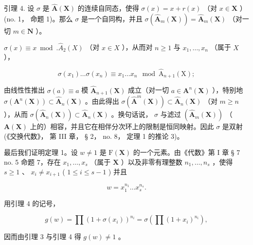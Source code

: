 引理 4. 设 \(\sigma\) 是 \(\hat{\mathbf{A}}(\mathbf{X})\) 的连续自同态，使得 \(\sigma(x) = x + r(x)\) （对 \(x \in \mathbf{X}\) ）(no. 1， 命题 1)。那么 \(\sigma\) 是一个自同构，并且 \(\sigma(\hat{\mathbf{A}}_m(\mathbf{X})) = \hat{\mathbf{A}}_m(\mathbf{X})\) （对一切 \(m \in \mathbf{N}\) ）。

\(\sigma(x) \equiv x \bmod. \hat{A}_2(X)\) （对 \(x \in X\) ），从而对 \(n \geqslant 1\) 与 \(x_1, \ldots, x_n\) （属于 \(X\) ），

\[
\sigma (x _ {1}) \dots \sigma (x _ {n}) \equiv x _ {1} \dots x _ {n} \mod \hat {\mathrm{A}} _ {n + 1} (\mathrm{X});
\]

由线性性推出 \(\sigma(a) \equiv a\) 模 \(\hat{\mathbf{A}}_{n+1}(\mathbf{X})\) 成立（对一切 \(a \in \mathbf{A}^n(\mathbf{X})\) ），特别地 \(\sigma(\mathbf{A}^n(\mathbf{X})) \subset \hat{\mathbf{A}}_n(\mathbf{X})\) 。由此得出 \(\sigma(\hat{\mathbf{A}}^m(\mathbf{X})) \subset \hat{\mathbf{A}}_n(\mathbf{X})\) （对 \(m \geqslant n\) ），从而 \(\sigma(\hat{\mathbf{A}}_n(\mathbf{X})) \subset \hat{\mathbf{A}}_n(\mathbf{X})\) 。换句话说， \(\sigma\) 与滤过 \((\hat{\mathbf{A}}_m(\mathbf{X}))\) （\(\mathbf{A}(\mathbf{X})\) 上的）相容，并且它在相伴分次环上的限制是恒同映射。因此 \(\sigma\) 是双射 (《交换代数》， 第 III 章， § 2， no. 8， 定理 1 的推论 3)。

最后我们证明定理 1。设 \(w \neq 1\) 是 \(\mathrm{F}(\mathbf{X})\) 的一个元素。由《代数》第 I 章 § 7 no. 5 命题 7，存在 \(x_{1}, \ldots, x_{s}\) （属于 \(\mathbf{X}\) ）以及非零有理整数 \(n_{1}, \ldots, n_{s}\) ，使得 \(s \geqslant 1\) 、 \(x_{i} \neq x_{i+1}\) ( \(1 \leqslant i \leqslant s - 1\) ) 并且

\[
w = x _ {1} ^ {n _ {1}} \dots x _ {s} ^ {n _ {s}}.
\]

用引理 4 的记号，

\[
g (w) = \prod (1 + \sigma (x _ {i})) ^ {n _ {i}} = \sigma (\prod (1 + x _ {i}) ^ {n _ {i}}),
\]

因而由引理 3 与引理 4 得 \(g(w) \neq 1\) 。

